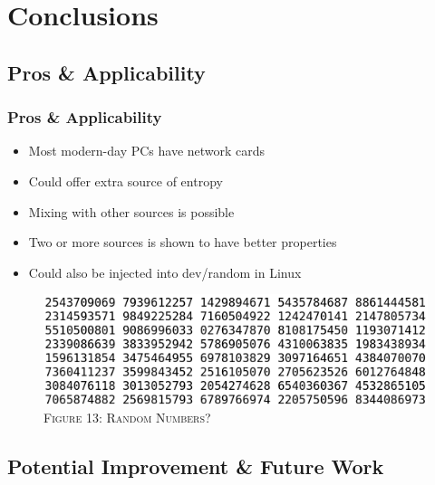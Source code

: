 \documentclass{beamer}
\begin{document}
\section{Conclusions}
\begin{frame}
\end{frame}

\subsection{Pros \& Applicability}
\begin{frame}
\frametitle{Pros \& Applicability}
\begin{itemize}
	\item Most modern-day PCs have network cards
	\item Could offer extra source of entropy
	\item Mixing with other sources is possible
	\item Two or more sources is shown to have better properties
	\item Could also be injected into dev/random in Linux
\end{itemize}
\begin{figure}

\includegraphics[scale = 0.5]{images/pi.png} \\
{\tiny \textsc{Figure 13: Random Numbers?}}
\end{figure}
\end{frame}
\subsection{Potential Improvement \& Future Work}
\end{document}
